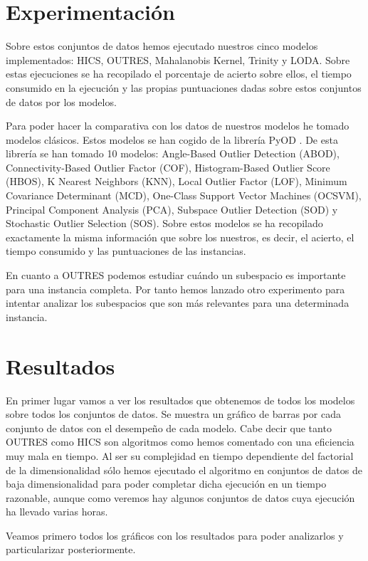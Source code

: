 \section{Experimentación}

Sobre estos conjuntos de datos hemos ejecutado nuestros cinco modelos implementados: HICS, OUTRES, Mahalanobis Kernel, Trinity y LODA. Sobre estas ejecuciones se ha recopilado el porcentaje de acierto sobre ellos, el tiempo consumido en la ejecución y las propias puntuaciones dadas sobre estos conjuntos de datos por los modelos.

Para poder hacer la comparativa con los datos de nuestros modelos he tomado modelos clásicos. Estos modelos se han cogido de la librería PyOD \cite{zhao_pyod:_2019}. De esta librería se han tomado 10 modelos: Angle-Based Outlier Detection (ABOD), Connectivity-Based Outlier Factor (COF), Histogram-Based Outlier Score (HBOS), K Nearest Neighbors (KNN), Local Outlier Factor (LOF), Minimum Covariance Determinant (MCD), One-Class Support Vector Machines (OCSVM), Principal Component Analysis (PCA), Subspace Outlier Detection (SOD) y Stochastic Outlier Selection (SOS). Sobre estos modelos se ha recopilado exactamente la misma información que sobre los nuestros, es decir, el acierto, el tiempo consumido y las puntuaciones de las instancias.

En cuanto a OUTRES podemos estudiar cuándo un subespacio es importante para una instancia completa. Por tanto hemos lanzado otro experimento para intentar analizar los subespacios que son más relevantes para una determinada instancia.

\section{Resultados}

En primer lugar vamos a ver los resultados que obtenemos de todos los modelos sobre todos los conjuntos de datos. Se muestra un gráfico de barras por cada conjunto de datos con el desempeño de cada modelo. Cabe decir que tanto OUTRES como HICS son algoritmos como hemos comentado con una eficiencia muy mala en tiempo. Al ser su complejidad en tiempo dependiente del factorial de la dimensionalidad sólo hemos ejecutado el algoritmo en conjuntos de datos de baja dimensionalidad para poder completar dicha ejecución en un tiempo razonable, aunque como veremos hay algunos conjuntos de datos cuya ejecución ha llevado varias horas.

Veamos primero todos los gráficos con los resultados para poder analizarlos y particularizar posteriormente.

